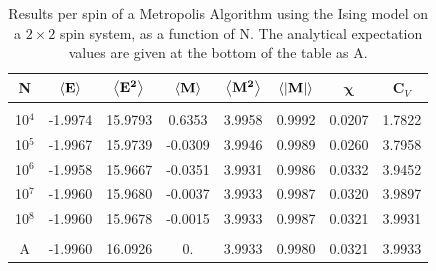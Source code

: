 \documentclass[%
reprint,nofootinbib,
amsmath,amssymb,
aps,
]{revtex4-1}
\begin{document}
\begin{table}[!h]
	\caption{\label{2b}Results per spin of a Metropolis Algorithm using the Ising model on a $2\times 2$ spin system, as a function of N. The analytical expectation values are given at the bottom of the table as A. }
	\begin{tabular}{|c|c|c|c|c|c|c|c|} \hline 
		\textbf{N}  & \hspace{1mm}	$\expval{\mathbf{E}}$ \hspace{1mm} & \hspace{1mm}$\expval{\mathbf{E^2}}$ \hspace{1mm} & \hspace{1mm}	$\expval{\mathbf{M}}$\hspace{1mm}  &	\hspace{1mm} $\expval{\mathbf{M^2}}$ \hspace{1mm}  &	\hspace{1mm}$\expval{\abs{\mathbf{M}}} $\hspace{1mm} & \hspace{2mm}$\mathbf{\chi}$	\hspace{2mm} & \hspace{2mm}	\textbf{C}$_V$\hspace{2mm} \\ \hline 
		&&&&&&&\\
		10$^4$   &  -1.9974   & 15.9793  &  0.6353 &   3.9958 &   0.9992&   0.0207 &   1.7822\\
		10$^5$    &          -1.9967   & 15.9739  &  -0.0309 &   3.9946 &   0.9989&   0.0260 &   3.7958\\ 
		
		10$^6$  &          -1.9958   & 15.9667  &  -0.0351 &   3.9931 &   0.9986&   0.0332 &   3.9452\\ 
		
		10$^7$  &          -1.9960   & 15.9680  &  -0.0037 &   3.9933 &   0.9987&   0.0320 &   3.9897\\ 
		10$^8$   &          -1.9960   & 15.9678  &  -0.0015 &   3.9933 &   0.9987&   0.0321 &   3.9931\\ 
		&&&&&&&\\ \hline 
		A &-1.9960 & 16.0926  &0.    &  3.9933 & 0.9980  & 0.0321&  3.9933 \\ \hline 
	\end{tabular}
\end{table} 

\newpage
\end{document}

